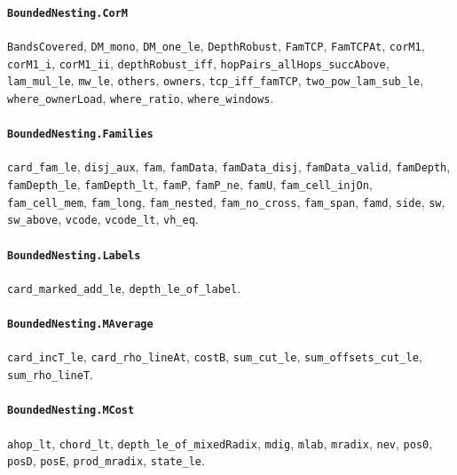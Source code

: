 \paragraph{\texttt{BoundedNesting.CorM}}
{\small\raggedright \texttt{BandsCovered}, \texttt{DM\_mono}, \texttt{DM\_one\_le}, \texttt{DepthRobust}, \texttt{FamTCP}, \texttt{FamTCPAt}, \texttt{corM1}, \texttt{corM1\_i}, \texttt{corM1\_ii}, \texttt{depthRobust\_iff}, \texttt{hopPairs\_allHops\_succAbove}, \texttt{lam\_mul\_le}, \texttt{mw\_le}, \texttt{others}, \texttt{owners}, \texttt{tcp\_iff\_famTCP}, \texttt{two\_pow\_lam\_sub\_le}, \texttt{where\_ownerLoad}, \texttt{where\_ratio}, \texttt{where\_windows}.\par}

\paragraph{\texttt{BoundedNesting.Families}}
{\small\raggedright \texttt{card\_fam\_le}, \texttt{disj\_aux}, \texttt{fam}, \texttt{famData}, \texttt{famData\_disj}, \texttt{famData\_valid}, \texttt{famDepth}, \texttt{famDepth\_le}, \texttt{famDepth\_lt}, \texttt{famP}, \texttt{famP\_ne}, \texttt{famU}, \texttt{fam\_cell\_injOn}, \texttt{fam\_cell\_mem}, \texttt{fam\_long}, \texttt{fam\_nested}, \texttt{fam\_no\_cross}, \texttt{fam\_span}, \texttt{famd}, \texttt{side}, \texttt{sw}, \texttt{sw\_above}, \texttt{vcode}, \texttt{vcode\_lt}, \texttt{vh\_eq}.\par}

\paragraph{\texttt{BoundedNesting.Labels}}
{\small\raggedright \texttt{card\_marked\_add\_le}, \texttt{depth\_le\_of\_label}.\par}

\paragraph{\texttt{BoundedNesting.MAverage}}
{\small\raggedright \texttt{card\_incT\_le}, \texttt{card\_rho\_lineAt}, \texttt{costB}, \texttt{sum\_cut\_le}, \texttt{sum\_offsets\_cut\_le}, \texttt{sum\_rho\_lineT}.\par}

\paragraph{\texttt{BoundedNesting.MCost}}
{\small\raggedright \texttt{ahop\_lt}, \texttt{chord\_lt}, \texttt{depth\_le\_of\_mixedRadix}, \texttt{mdig}, \texttt{mlab}, \texttt{mradix}, \texttt{nev}, \texttt{pos0}, \texttt{posD}, \texttt{posE}, \texttt{prod\_mradix}, \texttt{state\_le}.\par}

